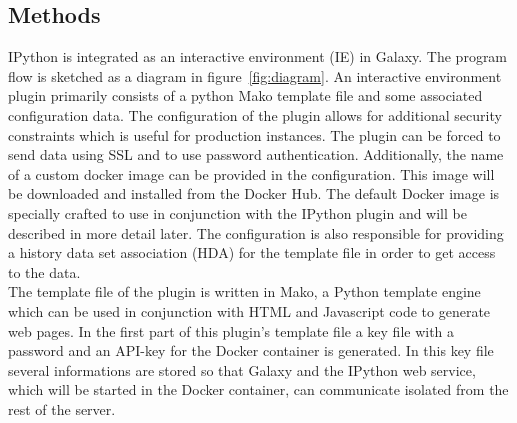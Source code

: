 \documentclass{bioinfo}
\begin{document}
\begin{methods}
\section{Methods}

IPython is integrated as an interactive environment (IE) in Galaxy. The program flow is sketched as a diagram in 
figure~\ref{fig:diagram}. An interactive environment plugin primarily consists of a python Mako template file and some
associated configuration data. The configuration of the plugin allows for additional security constraints which is useful
for production instances. The plugin can be forced to send data using SSL and to use password authentication.
Additionally, the name of a custom docker image can be provided in the configuration. This image will be downloaded and 
installed from the Docker Hub. The default Docker image is specially crafted to use in conjunction with the IPython plugin
and will be described in more detail later. The configuration is also responsible for providing a history data set 
association (HDA) for the template file in order to get access to the data. \\
The template file of the plugin is written in Mako, a Python template engine which can be used in conjunction with HTML
and Javascript code to generate web pages. In the first part of this plugin's template file a key file with a password
and an API-key for the Docker container is generated. In this key file several informations are stored so that Galaxy
and the IPython web service, which will be started in the Docker container, can communicate isolated from the rest of the server. %


\end{methods}
\end{document}
